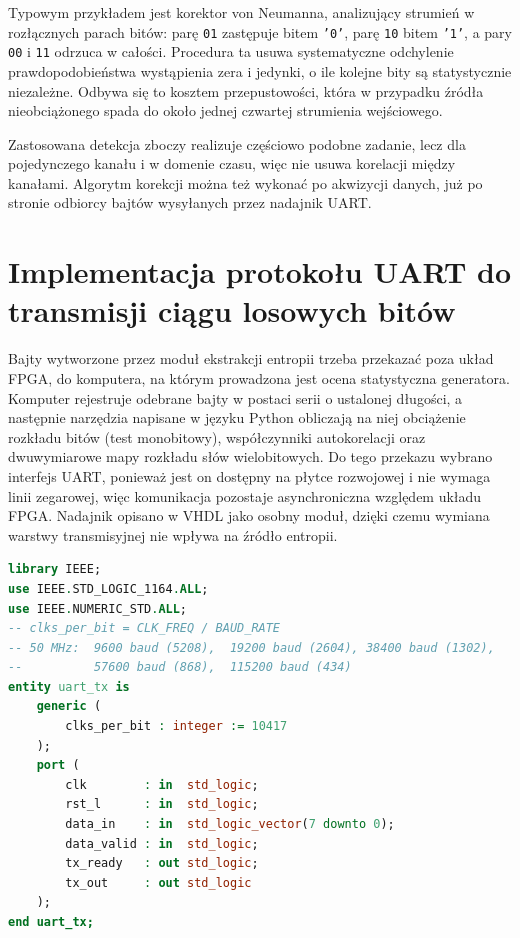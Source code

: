 Typowym przykładem jest korektor von Neumanna, analizujący strumień
w rozłącznych parach bitów: parę \texttt{01} zastępuje bitem \texttt{'0'},
parę \texttt{10} bitem \texttt{'1'}, a pary \texttt{00} i \texttt{11} odrzuca
w całości. Procedura ta usuwa systematyczne odchylenie prawdopodobieństwa
wystąpienia zera i jedynki, o ile kolejne bity są statystycznie niezależne.
Odbywa się to kosztem przepustowości, która w przypadku źródła nieobciążonego
spada do około jednej czwartej strumienia wejściowego.

Zastosowana detekcja zboczy realizuje częściowo podobne zadanie, lecz dla
pojedynczego kanału i w domenie czasu, więc nie usuwa korelacji między
kanałami. Algorytm korekcji można też wykonać po akwizycji danych, już po
stronie odbiorcy bajtów wysyłanych przez nadajnik UART.

\section{Implementacja protokołu UART do transmisji ciągu losowych bitów}

Bajty wytworzone przez moduł ekstrakcji entropii trzeba przekazać poza układ
FPGA, do komputera, na którym prowadzona jest ocena statystyczna generatora.
Komputer rejestruje odebrane bajty w postaci serii o ustalonej długości,
a następnie narzędzia napisane w języku Python obliczają na niej obciążenie
rozkładu bitów (test monobitowy), współczynniki autokorelacji oraz
dwuwymiarowe mapy rozkładu słów wielobitowych. Do tego przekazu wybrano
interfejs UART, ponieważ jest on dostępny na płytce rozwojowej i nie wymaga
linii zegarowej, więc komunikacja pozostaje asynchroniczna względem układu
FPGA. Nadajnik opisano w VHDL jako osobny moduł, dzięki czemu wymiana warstwy
transmisyjnej nie wpływa na źródło entropii.

\begin{lstlisting}[language=VHDL,
caption={Jednostka UART TX (uart\_tx.vhdl)},
label={lst:uart_tx_entity}]
library IEEE;
use IEEE.STD_LOGIC_1164.ALL;
use IEEE.NUMERIC_STD.ALL;
-- clks_per_bit = CLK_FREQ / BAUD_RATE
-- 50 MHz:  9600 baud (5208),  19200 baud (2604), 38400 baud (1302),
--          57600 baud (868),  115200 baud (434)
entity uart_tx is
    generic (
        clks_per_bit : integer := 10417
    );
    port (
        clk        : in  std_logic;
        rst_l      : in  std_logic;
        data_in    : in  std_logic_vector(7 downto 0);
        data_valid : in  std_logic;
        tx_ready   : out std_logic;
        tx_out     : out std_logic
    );
end uart_tx;
\end{lstlisting}

